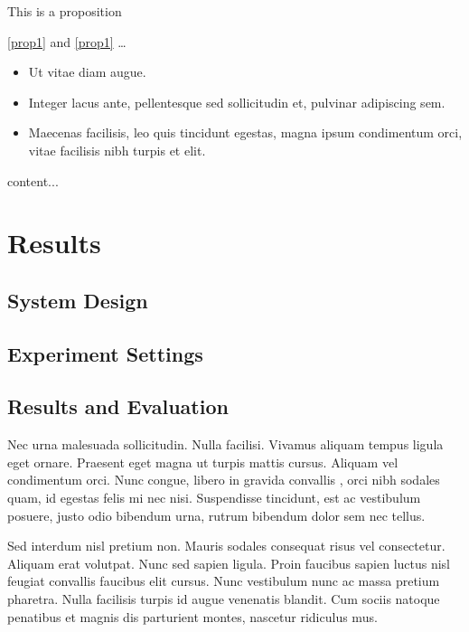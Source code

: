 \documentclass[
  a4paper,
  oneside,         %
  UKenglish,       %
  cleveref,        %
  autoref,         %
  thm-restate      %
]{lipics-v2021}
\begin{document}
\begin{proposition}\label{prop1}
This is a proposition
\end{proposition}

\autoref{prop1} and \cref{prop1} \ldots



\begin{itemize}
\item Ut vitae diam augue. 
\item Integer lacus ante, pellentesque sed sollicitudin et, pulvinar adipiscing sem. 
\item Maecenas facilisis, leo quis tincidunt egestas, magna ipsum condimentum orci, vitae facilisis nibh turpis et elit. 
\end{itemize}

\begin{remark}
content...
\end{remark}

\section{Results}
\subsection{System Design}
\subsection{Experiment Settings}
\subsection{Results and Evaluation}

Nec urna malesuada sollicitudin. Nulla facilisi. Vivamus aliquam tempus ligula eget ornare. Praesent eget magna ut turpis mattis cursus. Aliquam vel condimentum orci. Nunc congue, libero in gravida convallis \cite{DBLP:conf/focs/HopcroftPV75}, orci nibh sodales quam, id egestas felis mi nec nisi. Suspendisse tincidunt, est ac vestibulum posuere, justo odio bibendum urna, rutrum bibendum dolor sem nec tellus. 

\begin{lemma} 
Sed interdum nisl pretium non. Mauris sodales consequat risus vel consectetur. Aliquam erat volutpat. Nunc sed sapien ligula. Proin faucibus sapien luctus nisl feugiat convallis faucibus elit cursus. Nunc vestibulum nunc ac massa pretium pharetra. Nulla facilisis turpis id augue venenatis blandit. Cum sociis natoque penatibus et magnis dis parturient montes, nascetur ridiculus mus.
\end{lemma}
\end{document}
